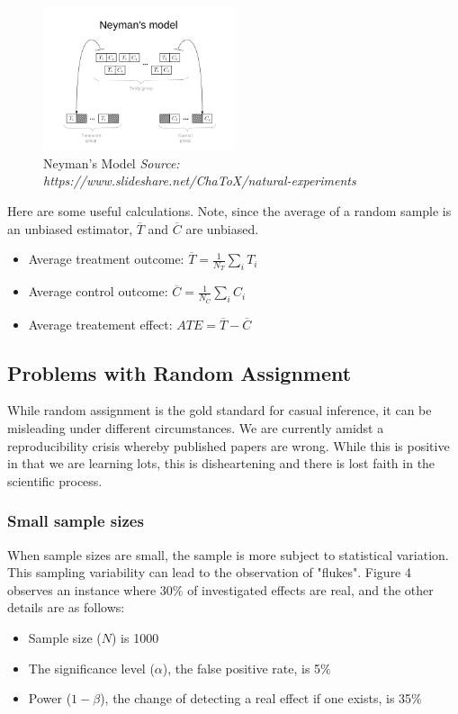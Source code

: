 \begin{figure}[ht]
  \begin{center}
    \includegraphics[width=0.5\textwidth]{figures/fig3}
        \caption{Neyman's Model  \textit{ Source: https://www.slideshare.net/ChaToX/natural-experiments}}
    \label{figure 3}
  \end{center}
\end{figure}

Here are some useful calculations. Note, since the average of a random sample is an unbiased estimator, $\overline{T}$ and  $\overline{C}$ are unbiased.
\begin{itemize}
\item Average treatment outcome: $\overline{T} = \frac{1}{N_T}\sum_{i}T_i$
\item Average control outcome: $\overline{C} = \frac{1}{N_C}\sum_{i}C_i$
\item Average treatement effect: $ATE = \overline{T} - \overline{C}$\\
\end{itemize}

\subsection{Problems with Random Assignment}
While random assignment is the gold standard for casual inference, it can be misleading under different circumstances.  We are currently amidst a reproducibility crisis whereby published papers are wrong.  While this is positive in that we are learning lots, this is disheartening and there is lost faith in the scientific process. 

\subsubsection{Small sample sizes}

When sample sizes are small, the sample is more subject to statistical variation.  This sampling variability can lead to the observation of "flukes". Figure 4 observes an instance where 30$\%$ of investigated effects are real, and the other details are as follows:
\begin{itemize}
\item Sample size ($N$) is 1000
\item The significance level ($\alpha$), the false positive rate, is 5$\%$
\item Power ($1-\beta$), the change of detecting a real effect if one exists, is 35$\%$
\end{itemize}

